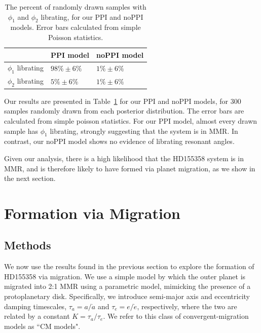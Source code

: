 \begin{table}
\begin{tabular}{p{2cm}p{1.8cm}p{1.8cm}}
\hline \hline
 & PPI model & noPPI model \\\hline
$\phi_1$ librating & $98\% \pm 6\%$ & $1\% \pm 6\%$ \\
$\phi_2$ librating & $5\% \pm 6\%$ & $1\% \pm 6\%$ \\
 \hline \hline
\end{tabular}
\caption{
The percent of randomly drawn samples with $\phi_1$ and $\phi_2$ librating, for our PPI and noPPI models. 
Error bars calculated from simple Poisson statistics. 
}
\label{tab:res}
\end{table}

Our results are presented in Table~\ref{tab:res} for our PPI and noPPI models, for 300 samples randomly drawn from each posterior distribution. 
The error bars are calculated from simple poisson statistics.
For our PPI model, almost every drawn sample has $\phi_1$ librating, strongly suggesting that the system is in MMR. 
In contrast, our noPPI model shows no evidence of librating resonant angles.

Given our analysis, there is a high likelihood that the HD155358 system is in MMR, and is therefore likely to have formed via planet migration, as we show in the next section.

\section{Formation via Migration}
\label{sec:form}
\subsection{Methods}
We now use the results found in the previous section to explore the formation of HD155358 via migration.
We use a simple model by which the outer planet is migrated into 2:1 MMR using a parametric model, mimicking the presence of a protoplanetary disk.
Specifically, we introduce semi-major axis and eccentricity damping timescales, $\tau_a = a/\dot{a}$ and $\tau_e = e/\dot{e}$, respectively, where the two are related by a constant $K = \tau_a / \tau_e$. 
We refer to this class of convergent-migration models as ``CM models". 

